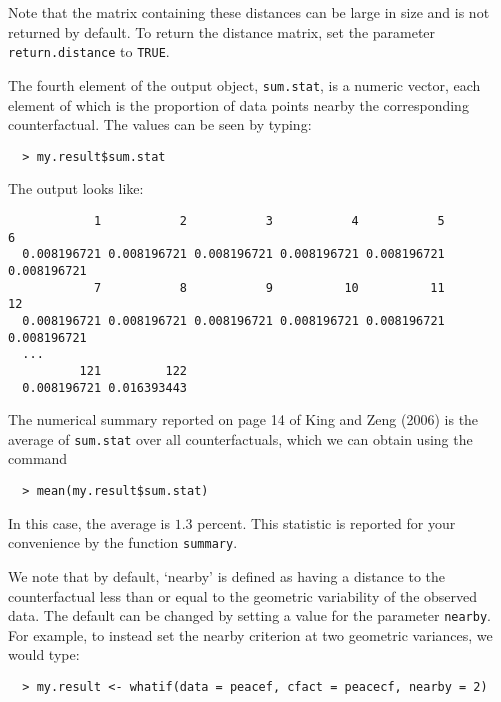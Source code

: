 \documentclass[oneside,letterpaper,titlepage]{article}
\begin{document}
Note that the matrix containing these distances can be large in size
and is not returned by default. To return the distance matrix, set the
parameter \texttt{return.distance} to \texttt{TRUE}.

The fourth element of the output object, \texttt{sum.stat}, is a numeric
vector, each element of which is the proportion of data points
nearby the corresponding counterfactual.  The values can be seen by
typing:
  \begin{verbatim}
  > my.result$sum.stat
  \end{verbatim} %
The output looks like:
  \begin{verbatim}
            1           2           3           4           5           6 
  0.008196721 0.008196721 0.008196721 0.008196721 0.008196721 0.008196721 
            7           8           9          10          11          12
  0.008196721 0.008196721 0.008196721 0.008196721 0.008196721 0.008196721 
  ...
          121         122
  0.008196721 0.016393443
  \end{verbatim}
The numerical summary reported on page 14 of King and Zeng (2006) is
the average of \texttt{sum.stat} over all counterfactuals, which we can obtain
using the command
  \begin{verbatim}
  > mean(my.result$sum.stat)  
  \end{verbatim} %
In this case, the average is $1.3$ percent.  This statistic is reported
for your convenience by the function \texttt{summary}.

We note that by default, `nearby' is defined as having a distance to
the counterfactual less than or equal to the geometric variability of
the observed data.  The default can be changed by setting a value for
the parameter \texttt{nearby}.  For example, to instead set the nearby
criterion at two geometric variances, we would type:
  \begin{verbatim}
  > my.result <- whatif(data = peacef, cfact = peacecf, nearby = 2)
  \end{verbatim}
\end{document}
